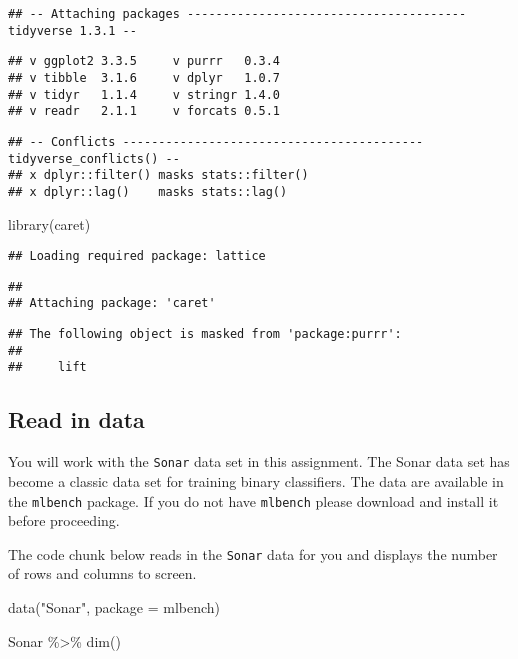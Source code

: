 \documentclass[
]{article}
\newenvironment{Shaded}{\begin{snugshade}}{\end{snugshade}}
\newcommand{\AttributeTok}[1]{\textcolor[rgb]{0.77,0.63,0.00}{#1}}
\newcommand{\FunctionTok}[1]{\textcolor[rgb]{0.00,0.00,0.00}{#1}}
\newcommand{\NormalTok}[1]{#1}
\newcommand{\SpecialCharTok}[1]{\textcolor[rgb]{0.00,0.00,0.00}{#1}}
\newcommand{\StringTok}[1]{\textcolor[rgb]{0.31,0.60,0.02}{#1}}
\begin{document}
\begin{verbatim}
## -- Attaching packages --------------------------------------- tidyverse 1.3.1 --
\end{verbatim}

\begin{verbatim}
## v ggplot2 3.3.5     v purrr   0.3.4
## v tibble  3.1.6     v dplyr   1.0.7
## v tidyr   1.1.4     v stringr 1.4.0
## v readr   2.1.1     v forcats 0.5.1
\end{verbatim}

\begin{verbatim}
## -- Conflicts ------------------------------------------ tidyverse_conflicts() --
## x dplyr::filter() masks stats::filter()
## x dplyr::lag()    masks stats::lag()
\end{verbatim}

\begin{Shaded}
\begin{Highlighting}[]
\FunctionTok{library}\NormalTok{(caret)}
\end{Highlighting}
\end{Shaded}

\begin{verbatim}
## Loading required package: lattice
\end{verbatim}

\begin{verbatim}
## 
## Attaching package: 'caret'
\end{verbatim}

\begin{verbatim}
## The following object is masked from 'package:purrr':
## 
##     lift
\end{verbatim}

\hypertarget{read-in-data}{%
\subsection{Read in data}\label{read-in-data}}

You will work with the \texttt{Sonar} data set in this assignment. The
Sonar data set has become a classic data set for training binary
classifiers. The data are available in the \texttt{mlbench} package. If
you do not have \texttt{mlbench} please download and install it before
proceeding.

The code chunk below reads in the \texttt{Sonar} data for you and
displays the number of rows and columns to screen.

\begin{Shaded}
\begin{Highlighting}[]
\FunctionTok{data}\NormalTok{(}\StringTok{"Sonar"}\NormalTok{, }\AttributeTok{package =} \StringTok{\textquotesingle{}mlbench\textquotesingle{}}\NormalTok{)}

\NormalTok{Sonar }\SpecialCharTok{\%\textgreater{}\%} \FunctionTok{dim}\NormalTok{()}
\end{Highlighting}
\end{Shaded}
\end{document}
